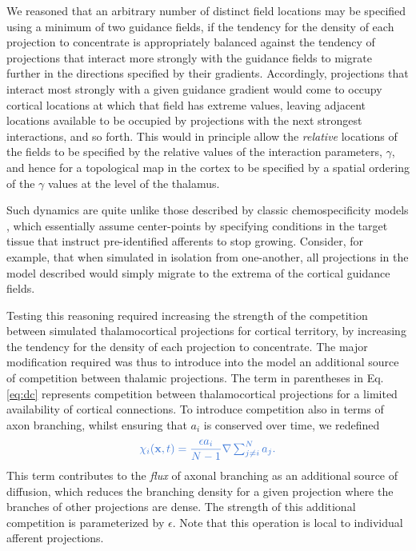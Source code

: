 \documentclass[9pt,lineno]{elife}
\newcommand{\MPtwo}[1]{\textcolor{revblue}{#1}}
\newcommand{\mpfive}[1]{\textcolor{revpurp2}{#1}}
\newcommand{\mb}[1]{\mathbf{#1}}
\begin{document}
\mpfive{We reasoned that an arbitrary number of distinct field locations
  may be specified using a minimum of two guidance fields, if the tendency for
  the density of each projection to concentrate is appropriately balanced
  against the tendency of projections that interact more strongly with the
  guidance fields to migrate further in the directions specified by their
  gradients. Accordingly, projections that interact most strongly with a given
  guidance gradient would come to occupy cortical locations at which that
  field has extreme values, leaving adjacent locations available to be
  occupied by projections with the next strongest interactions, and so
  forth. This would in principle allow the \emph{relative} locations of the
  fields to be specified by the relative values of the interaction parameters,
  $\gamma$, and hence for a topological map in the cortex to be specified by a
  spatial ordering of the $\gamma$ values at the level of the thalamus.}

\mpfive{Such dynamics are quite unlike those described by classic
  chemospecificity models} \citep{sperry_chemoaffinity_1963},
\mpfive{which essentially assume center-points by specifying conditions
  in the target tissue that instruct pre-identified afferents to stop
  growing. Consider, for example, that when simulated in isolation from
  one-another, all projections in the model described would simply migrate to
  the extrema of the cortical guidance fields.}

\mpfive{Testing this reasoning required increasing the strength of the
  competition between simulated thalamocortical projections for cortical
  territory, by increasing the tendency for the density of each projection to
  concentrate. The major modification required was thus to introduce into the
  model an additional source of competition between thalamic projections.}
%
The term in parentheses in Eq.\,\ref{eq:dc} represents competition between
thalamocortical projections for a limited availability of cortical
connections. To introduce competition also in terms of axon branching,
\MPtwo{whilst ensuring that $a_i$ is conserved over time,} we
redefined
%
\begin{equation} \label{eq:comp}
  \color{revblue}
  \chi_i(\mb{x}, t) = \frac{\epsilon a_i}{N-1} \nabla \textstyle\sum_{j\ne i}^{N}{a_j}.
  \color{black}
\end{equation}
%
\mpfive{This term contributes to the \emph{flux} of axonal branching as
  an additional source of diffusion, which reduces the branching density for a
  given projection where the branches of other projections are dense. The
  strength of this additional competition is parameterized by
  $\epsilon$}. Note that this operation is local to individual afferent
projections.
\end{document}
